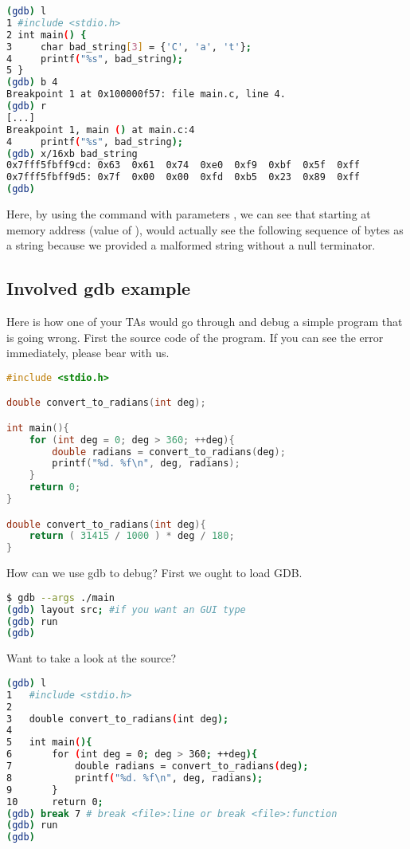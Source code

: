 \begin{lstlisting}[language=bash]
(gdb) l
1 #include <stdio.h>
2 int main() {
3     char bad_string[3] = {'C', 'a', 't'};
4     printf("%s", bad_string);
5 }
(gdb) b 4
Breakpoint 1 at 0x100000f57: file main.c, line 4.
(gdb) r
[...]
Breakpoint 1, main () at main.c:4
4     printf("%s", bad_string);
(gdb) x/16xb bad_string
0x7fff5fbff9cd: 0x63  0x61  0x74  0xe0  0xf9  0xbf  0x5f  0xff
0x7fff5fbff9d5: 0x7f  0x00  0x00  0xfd  0xb5  0x23  0x89  0xff
(gdb)
\end{lstlisting}

Here, by using the  command with parameters , we can see that starting at memory address  (value of ),  would actually see the following sequence of bytes as a string because we provided a malformed string without a null terminator.

\subsection{Involved gdb example}

Here is how one of your TAs would go through and debug a simple program that is going wrong.
First the source code of the program.
If you can see the error immediately, please bear with us.

\begin{lstlisting}[language=C]
#include <stdio.h>

double convert_to_radians(int deg);

int main(){
	for (int deg = 0; deg > 360; ++deg){
		double radians = convert_to_radians(deg);
		printf("%d. %f\n", deg, radians);
	}
	return 0;
}

double convert_to_radians(int deg){
	return ( 31415 / 1000 ) * deg / 180;
}
\end{lstlisting}

How can we use gdb to debug? First we ought to load GDB.

\begin{lstlisting}[language=bash]
$ gdb --args ./main
(gdb) layout src; #if you want an GUI type
(gdb) run
(gdb)
\end{lstlisting}

Want to take a look at the source?

\begin{lstlisting}[language=bash]
(gdb) l
1	#include <stdio.h>
2	
3	double convert_to_radians(int deg);
4	
5	int main(){
6		for (int deg = 0; deg > 360; ++deg){
7			double radians = convert_to_radians(deg);
8			printf("%d. %f\n", deg, radians);
9		}
10	    return 0;
(gdb) break 7 # break <file>:line or break <file>:function
(gdb) run
(gdb)
\end{lstlisting}

